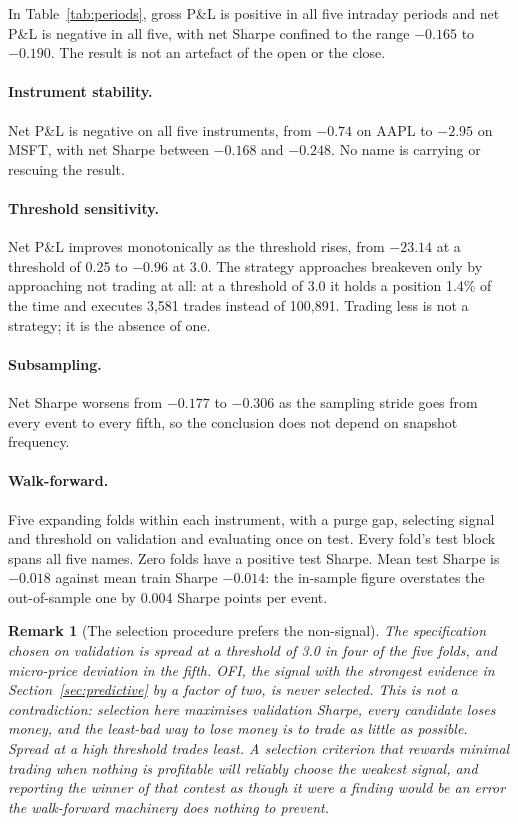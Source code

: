 \documentclass[11pt]{scrartcl}
\newtheorem{remark}{Remark}[section]
\begin{document}
In Table~\ref{tab:periods}, gross P\&L is positive in all five intraday periods and net P\&L is negative in all five, with net Sharpe confined to the range $-0.165$ to $-0.190$. The result is not an artefact of the open or the close.

\paragraph{Instrument stability.} Net P\&L is negative on all five instruments, from $-0.74$ on AAPL to $-2.95$ on MSFT, with net Sharpe between $-0.168$ and $-0.248$. No name is carrying or rescuing the result.

\paragraph{Threshold sensitivity.} Net P\&L improves monotonically as the threshold rises, from $-23.14$ at a threshold of 0.25 to $-0.96$ at 3.0. The strategy approaches breakeven only by approaching not trading at all: at a threshold of 3.0 it holds a position 1.4\% of the time and executes 3{,}581 trades instead of 100{,}891. Trading less is not a strategy; it is the absence of one.

\paragraph{Subsampling.} Net Sharpe worsens from $-0.177$ to $-0.306$ as the sampling stride goes from every event to every fifth, so the conclusion does not depend on snapshot frequency.

\paragraph{Walk-forward.} Five expanding folds within each instrument, with a purge gap, selecting signal and threshold on validation and evaluating once on test. Every fold's test block spans all five names. Zero folds have a positive test Sharpe. Mean test Sharpe is $-0.018$ against mean train Sharpe $-0.014$: the in-sample figure overstates the out-of-sample one by 0.004 Sharpe points per event.

\begin{remark}[The selection procedure prefers the non-signal]
\label{rem:selection}
The specification chosen on validation is spread at a threshold of 3.0 in four of the five folds, and micro-price deviation in the fifth. OFI, the signal with the strongest evidence in Section~\ref{sec:predictive} by a factor of two, is never selected. This is not a contradiction: selection here maximises validation Sharpe, every candidate loses money, and the least-bad way to lose money is to trade as little as possible. Spread at a high threshold trades least. A selection criterion that rewards minimal trading when nothing is profitable will reliably choose the weakest signal, and reporting the winner of that contest as though it were a finding would be an error the walk-forward machinery does nothing to prevent.
\end{remark}
\end{document}

